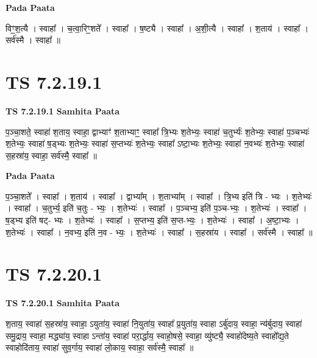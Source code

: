 \documentclass[17pt]{extarticle}
\begin{document}
\textbf{Pada Paata} \newline

विꣳ॒॒श॒त्यै । स्वाहा᳚ । च॒त्वा॒रिꣳ॒॒शते᳚ । स्वाहा᳚ । ष॒ष्ट्यै । स्वाहा᳚ । अ॒शी॒त्यै । स्वाहा᳚ । श॒ताय॑ । स्वाहा᳚ । सर्व॑स्मै । स्वाहा᳚ ॥  \newline





\section{ TS 7.2.19.1 }

\textbf{TS 7.2.19.1 } \newline
\textbf{Samhita Paata} \newline

प॒ञ्चा॒शते॒ स्वाहा॑ श॒ताय॒ स्वाहा॒ द्वाभ्याꣳ॑ श॒ताभ्याꣳ॒॒ स्वाहा᳚ त्रि॒भ्यः श॒तेभ्यः॒ स्वाहा॑ च॒तुर्भ्यः॑ श॒तेभ्यः॒ स्वाहा॑ प॒ञ्चभ्यः॑ श॒तेभ्यः॒ स्वाहा॑ ष॒ड्भ्यः श॒तेभ्यः॒ स्वाहा॑ स॒प्तभ्यः॑ श॒तेभ्यः॒ स्वाहा᳚ ऽष्टा॒भ्यः श॒तेभ्यः॒ स्वाहा॑ न॒वभ्यः॑ श॒तेभ्यः॒ स्वाहा॑ स॒हस्रा॑य॒ स्वाहा॒ सर्व॑स्मै॒ स्वाहा᳚ ॥ \newline

\textbf{Pada Paata} \newline

प॒ञ्चा॒शते᳚ । स्वाहा᳚ । श॒ताय॑ । स्वाहा᳚ । द्वाभ्या᳚म् । श॒ताभ्या᳚म् । स्वाहा᳚ । त्रि॒भ्य इति॑ त्रि - भ्यः । श॒तेभ्यः॑ । स्वाहा᳚ । च॒तुर्भ्य॒ इति॑ च॒तुः - भ्यः॒ । श॒तेभ्यः॑ । स्वाहा᳚ । प॒ञ्चभ्य॒ इति॑ प॒ञ्च-भ्यः॒ । श॒तेभ्यः॑ । स्वाहा᳚ । ष॒ड्भ्य इति॑ षट्- भ्यः । श॒तेभ्यः॑ । स्वाहा᳚ । स॒प्तभ्य॒ इति॑ स॒प्त-भ्यः॒ । श॒तेभ्यः॑ । स्वाहा᳚ । अ॒ष्टा॒भ्यः । श॒तेभ्यः॑ । स्वाहा᳚ । न॒वभ्य॒ इति॑ न॒व - भ्यः॒ । श॒तेभ्यः॑ । स्वाहा᳚ । स॒हस्रा॑य । स्वाहा᳚ । सर्व॑स्मै । स्वाहा᳚ ॥  \newline





\section{ TS 7.2.20.1 }

\textbf{TS 7.2.20.1 } \newline
\textbf{Samhita Paata} \newline

श॒ताय॒ स्वाहा॑ स॒हस्रा॑य॒ स्वाहा॒ ऽयुता॑य॒ स्वाहा॑ नि॒युता॑य॒ स्वाहा᳚ प्र॒युता॑य॒ स्वाहा ऽर्बु॑दाय॒ स्वाहा॒ न्य॑र्बुदाय॒ स्वाहा॑ समु॒द्राय॒ स्वाहा॒ मद्ध्या॑य॒ स्वाहा ऽन्ता॑य॒ स्वाहा॑ परा॒र्द्धाय॒ स्वाहो॒षसे॒ स्वाहा॒ व्यु॑ष्ट्यै॒ स्वाहो॑देष्य॒ते स्वाहो᳚द्य॒ते स्वाहोदि॑ताय॒ स्वाहा॑ सुव॒र्गाय॒ स्वाहा॑ लो॒काय॒ स्वाहा॒ सर्व॑स्मै॒ स्वाहा᳚ ॥ \newline
\end{document}

